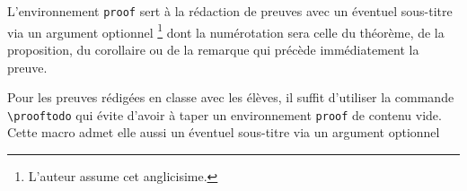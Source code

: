 L'environnement \verb+proof+ sert à la rédaction de preuves avec un éventuel sous-titre via un argument optionnel
\footnote{
	L'auteur assume cet anglicisime.
}
dont la numérotation sera celle du théorème, de la proposition, du corollaire ou de la remarque qui précède immédiatement la preuve. 


\medskip


Pour les preuves rédigées en classe avec les élèves, il suffit d'utiliser la commande \verb+\prooftodo+ qui évite d'avoir à taper un environnement \verb+proof+ de contenu vide. Cette macro admet elle aussi un éventuel sous-titre via un argument optionnel